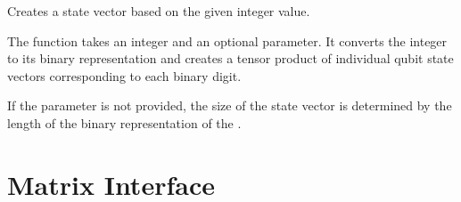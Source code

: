 \documentclass[letterpaper,10pt,english]{sphinxmanual}
\begin{document}
\begin{fulllineitems}
\label{\detokenize{index:utils.state_vector.makeStateVector}}
\pysigstartsignatures
{}
\pysigstopsignatures
\sphinxAtStartPar
Creates a state vector based on the given integer value.

\sphinxAtStartPar
The function takes an integer  and an optional  parameter. It converts
the integer to its binary representation and creates a tensor product of individual
qubit state vectors corresponding to each binary digit.

\sphinxAtStartPar
If the  parameter is not provided, the size of the state vector is determined
by the length of the binary representation of the .

\end{fulllineitems}


\chapter{Matrix Interface}
\label{\detokenize{index:matrix-interface}}\label{\detokenize{index:module-utils.matrixInterface}}
\end{document}
